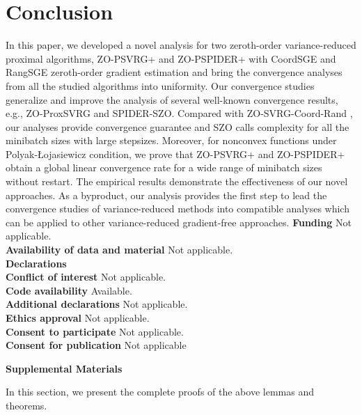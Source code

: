 \documentclass[iicol,sn-basic]{sn-jnl}
\theoremstyle{thmstyleone}%
\theoremstyle{thmstyletwo}%
\theoremstyle{thmstylethree}%
\begin{document}
\section{Conclusion}
In this paper, we developed a novel analysis for two zeroth-order variance-reduced proximal algorithms, ZO-PSVRG+ and ZO-PSPIDER+ with CoordSGE and RangSGE zeroth-order gradient estimation and bring the convergence analyses from all the studied algorithms into uniformity. Our convergence studies generalize and improve the analysis of several well-known convergence results, e.g., ZO-ProxSVRG and SPIDER-SZO. Compared with ZO-SVRG-Coord-Rand \cite{ji2019improved}, our analyses provide convergence guarantee and SZO calls complexity for all the minibatch sizes with large stepsizes. Moreover, for nonconvex functions under Polyak-Łojasiewicz condition, we prove that ZO-PSVRG+ and ZO-PSPIDER+ obtain a global linear convergence rate for a wide range of minibatch sizes without restart. The empirical results demonstrate the effectiveness of our novel approaches. As a byproduct, our analysis provides the first step to lead the convergence studies of variance-reduced methods into compatible analyses which can be applied to other variance-reduced gradient-free approaches.\newpage
%
\noindent\textbf{Funding} Not applicable.\\
\textbf{Availability of data and material} Not applicable.\\
\textbf{Declarations}\\
\textbf{Conflict of interest} Not applicable.\\
\textbf{Code availability} Available.\\
\textbf{Additional declarations} Not applicable.\\
\textbf{Ethics approval} Not applicable.\\
\textbf{Consent to participate} Not applicable.\\
\textbf{Consent for publication} Not applicable

\onecolumn %
\renewcommand\theequation{A-\arabic{equation}}
\renewcommand{\theequation}{S\arabic{equation}}
\setcounter{equation}{0}
\setcounter{figure}{0}
\setcounter{table}{0}
\setcounter{page}{1}
\begin{center}
\textbf{\large Supplemental Materials}
\end{center}
In this section, we present the complete proofs of the above lemmas and theorems.
\end{document}
